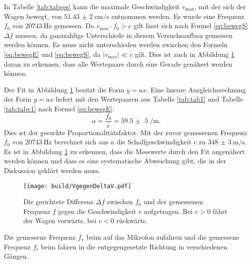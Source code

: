 In Tabelle \ref{tab:tabges} kann die maximale Geschwindigkeit $v_{\text{max}}$, mit der sich der Wagen bewegt, von $\SI{51,43(2)}{\centi\meter\per\second}$ entnommen werden. Es wurde eine Frequenz $f_0$ von $\SI{20743}{\hertz}$ gemessen.
Da $v_{\text{max}} \cdot f_0 > c$ gilt lässt sich nach Formel \eqref{eq:bewegS} $\Delta f$ messen, da ganzzahlige Unterschiede in diesem Versuchsaufbau gemessen werden können.
Es muss nicht unterschieden werden zwischen den Formeln \eqref{eq:bewegE} und \eqref{eq:bewegS}, da $|v_\text{max}| \ll c$ gilt. Dies ist auch in Abbildung \ref{fig:Graph1} daran zu erkennen, dass alle Wertepaare durch eine Gerade genähert werden können.

Der Fit in Abbildung \ref{fig:Graph1} besitzt die Form $y=a x$. Eine lineare Ausgleichsrechnung der Form $y=a x$ liefert mit den Wertepaaren aus Tabelle \ref{tab:tab1} und Tabelle \ref{tab:tabv1} nach Formel \eqref{eq:bewegE}:
\begin{displaymath}
a = \frac{f_0}{c} = \SI{59.5(5)}{\per\meter}\text{.}
\end{displaymath}
Dies ist der gesuchte Proportionalitätsfaktor. Mit der zuvor gemessenen Frequenz $f_0$ von $\SI{20743}{\hertz}$ berechnet sich aus $a$ die Schallgeschwindigkeit $c$ zu $\SI{348(3)}{\meter\per\second}$.
Es ist in Abbildung \ref{fig:Graph1} zu erkennen, dass die Messwerte durch den Fit angenähert werden können und dass es eine systematische Abweichung gibt, die in der Diskussion geklärt werden muss.
\begin{figure}
	\centering
	\caption{Die  gerichtete Differenz $\Delta f $ zwischen $f_0$ und der gemessenen Frequenz $f$ gegen die Geschwindigkeit $v$ aufgetragen. Bei $v > 0$ fährt der Wagen vorwärts, bei $v < 0$ rückwärts.}
	\texttt{[image: build/VgegenDeltaV.pdf]}
	\label{fig:Graph1}
\end{figure}
\begin{table}
	\caption{Die gemessene Frequenz $f_\text{v}$ beim auf das Mikrofon zufahren und die gemessene Frequenz $f_\text{r}$ beim fahren in die entgegengesetzte Richtung in verschiedenen Gängen.}
	\begin{minipage}{0.5\textwidth}
		\centering
		
	\end{minipage}
	\begin{minipage}{0.5\textwidth}
		\centering
		
	\end{minipage}
\end{table}

